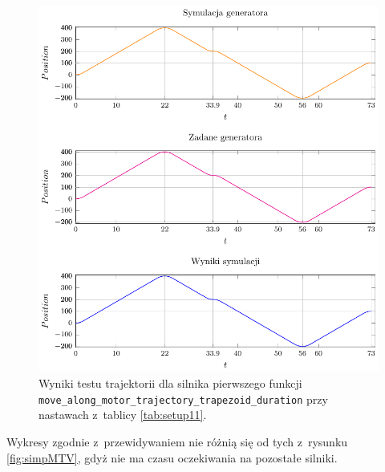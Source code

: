 \documentclass[a4paper, 12pt]{article}
\begin{document}
	\begin{figure}[H]
		\centering
		\includegraphics[scale=1.1]{raport_graphs/simpMTD.pdf}
		\caption{Wyniki testu trajektorii dla silnika pierwszego funkcji \texttt{move\_along\_motor\_trajectory\_trapezoid\_duration} przy nastawach z~tablicy \ref{tab:setup11}.}
		\label{fig:simpMTD}
	\end{figure}
	
	Wykresy zgodnie z~przewidywaniem nie różnią się od tych z~rysunku \ref{fig:simpMTV}, gdyż nie ma czasu oczekiwania na pozostałe silniki.
	
\end{document}
